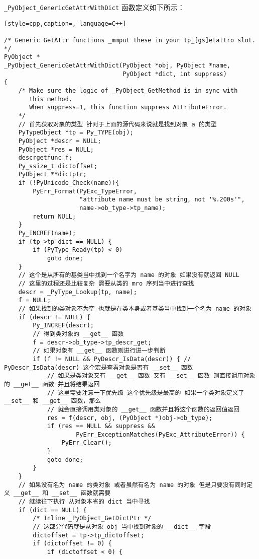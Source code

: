 \verb|_PyObject_GenericGetAttrWithDict| 函数定义如下所示：
\begin{lstlisting}[style=cpp,caption=, language=C++]

/* Generic GetAttr functions _mmput these in your tp_[gs]etattro slot. */ 
PyObject *
_PyObject_GenericGetAttrWithDict(PyObject *obj, PyObject *name,
                                 PyObject *dict, int suppress)
{
    /* Make sure the logic of _PyObject_GetMethod is in sync with
       this method.
       When suppress=1, this function suppress AttributeError.
    */
    // 首先获取对象的类型 针对于上面的源代码来说就是找到对象 a 的类型
    PyTypeObject *tp = Py_TYPE(obj);
    PyObject *descr = NULL;
    PyObject *res = NULL;
    descrgetfunc f;
    Py_ssize_t dictoffset;
    PyObject **dictptr;
    if (!PyUnicode_Check(name)){
        PyErr_Format(PyExc_TypeError,
                     "attribute name must be string, not '%.200s'",
                     name->ob_type->tp_name);
        return NULL;
    }
    Py_INCREF(name);
    if (tp->tp_dict == NULL) {
        if (PyType_Ready(tp) < 0)
            goto done;
    }
    // 这个是从所有的基类当中找到一个名字为 name 的对象 如果没有就返回 NULL
    // 这里的过程还是比较复杂 需要从类的 mro 序列当中进行查找
    descr = _PyType_Lookup(tp, name);
    f = NULL;
    // 如果找到的类对象不为空 也就是在类本身或者基类当中找到一个名为 name 的对象
    if (descr != NULL) {
        Py_INCREF(descr);
        // 得到类对象的 __get__ 函数
        f = descr->ob_type->tp_descr_get;
        // 如果对象有 __get__ 函数则进行进一步判断
        if (f != NULL && PyDescr_IsData(descr)) { // PyDescr_IsData(descr) 这个宏是查看对象是否有 __set__ 函数
            // 如果是类对象又有 __get__ 函数 又有 __set__ 函数 则直接调用对象的 __get__ 函数 并且将结果返回
            // 这里需要注意一下优先级 这个优先级是最高的 如果一个类对象定义了 __set__ 和 __get__ 函数，那么
            // 就会直接调用类对象的 __get__ 函数并且将这个函数的返回值返回
            res = f(descr, obj, (PyObject *)obj->ob_type);
            if (res == NULL && suppress &&
                    PyErr_ExceptionMatches(PyExc_AttributeError)) {
                PyErr_Clear();
            }
            goto done;
        }
    }
    // 如果没有名为 name 的类对象 或者虽然有名为 name 的对象 但是只要没有同时定义 __get__ 和 __set__ 函数就需要
    // 继续往下执行 从对象本省的 dict 当中寻找
    if (dict == NULL) {
        /* Inline _PyObject_GetDictPtr */
        // 这部分代码就是从对象 obj 当中找到对象的 __dict__ 字段
        dictoffset = tp->tp_dictoffset;
        if (dictoffset != 0) {
            if (dictoffset < 0) {

\end{lstlisting}
